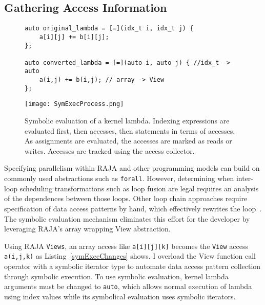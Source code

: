 \subsection{Gathering Access Information}
\label{subsec:accesses}
\begin{figure}[t]
\begin{lstlisting}[label={symExecChanges}, caption={Kernel Lambda Conversion}]
auto original_lambda = [=](idx_t i, idx_t j) {
	a[i][j] += b[i][j];
};

auto converted_lambda = [=](auto i, auto j) { //idx_t -> auto
	a(i,j) += b(i,j); // array -> View
};
\end{lstlisting}
\end{figure}

\begin{figure}
\texttt{[image: SymExecProcess.png]}
\caption{Symbolic evaluation of a kernel lambda. 
Indexing expressions are evaluated first, then accesses, then statements in terms of accesses.
As assignments are evaluated, the accesses are marked as reads or writes.
Accesses are tracked using the access collector.}
\label{symExec}
\end{figure}
Specifying parallelism within RAJA and other programming models can
build on commonly used abstractions such as \verb.forall..
However, determining when inter-loop scheduling transformations such as
loop fusion are legal requires an analysis of the dependences between those loops.
Other loop chain approaches require specification of data access patterns by
hand, which effectively rewrites the loop~\cite{bertolacci2019using}.
The symbolic evaluation mechanism eliminates this effort for the
developer by leveraging RAJA's array wrapping View abstraction.

Using RAJA \verb.Views.,
an array access like \verb.a[i][j][k]. becomes the \verb.View. access \verb.a(i,j,k). as
Listing~\ref{symExecChanges} shows.
I overload the View function call operator with a symbolic iterator type to automate
data access pattern collection through symbolic execution.
To use symbolic evaluation, kernel lambda arguments must be changed to
\verb.auto., which allows normal execution of lambda using index values while
its symbolical evaluation uses symbolic iterators.

